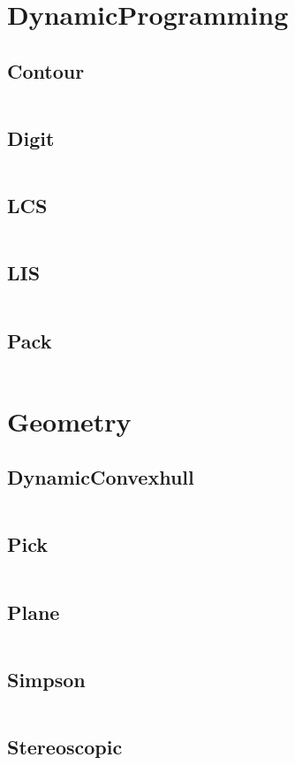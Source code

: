 \documentclass[a4paper,11pt]{article}
\begin{document}
\newpage
\section{DynamicProgramming}
\subsection{Contour}
\inputminted[breaklines]{c++}{DynamicProgramming/+Contour.cpp}
\subsection{Digit}
\inputminted[breaklines]{c++}{DynamicProgramming/+Digit.cpp}
\subsection{LCS}
\inputminted[breaklines]{c++}{DynamicProgramming/+LCS.cpp}
\subsection{LIS}
\inputminted[breaklines]{c++}{DynamicProgramming/+LIS.cpp}
\subsection{Pack}
\inputminted[breaklines]{c++}{DynamicProgramming/+Pack.cpp}

\newpage
\section{Geometry}
\subsection{DynamicConvexhull}
\inputminted[breaklines]{c++}{Geometry/+DynamicConvexhull.cpp}
\subsection{Pick}
\inputminted[breaklines]{c++}{Geometry/+Pick.cpp}
\subsection{Plane}
\inputminted[breaklines]{c++}{Geometry/+Plane.cpp}
\subsection{Simpson}
\inputminted[breaklines]{c++}{Geometry/+Simpson.cpp}
\subsection{Stereoscopic}
\inputminted[breaklines]{c++}{Geometry/+Stereoscopic.cpp}
\end{document}
